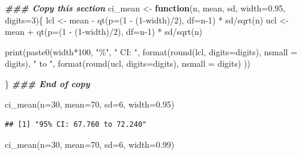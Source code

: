 \documentclass[
]{memoir}
\newenvironment{Shaded}{\begin{snugshade}}{\end{snugshade}}
\newcommand{\AttributeTok}[1]{\textcolor[rgb]{0.77,0.63,0.00}{#1}}
\newcommand{\ControlFlowTok}[1]{\textcolor[rgb]{0.13,0.29,0.53}{\textbf{#1}}}
\newcommand{\DecValTok}[1]{\textcolor[rgb]{0.00,0.00,0.81}{#1}}
\newcommand{\DocumentationTok}[1]{\textcolor[rgb]{0.56,0.35,0.01}{\textbf{\textit{#1}}}}
\newcommand{\FloatTok}[1]{\textcolor[rgb]{0.00,0.00,0.81}{#1}}
\newcommand{\FunctionTok}[1]{\textcolor[rgb]{0.00,0.00,0.00}{#1}}
\newcommand{\NormalTok}[1]{#1}
\newcommand{\OtherTok}[1]{\textcolor[rgb]{0.56,0.35,0.01}{#1}}
\newcommand{\SpecialCharTok}[1]{\textcolor[rgb]{0.00,0.00,0.00}{#1}}
\newcommand{\StringTok}[1]{\textcolor[rgb]{0.31,0.60,0.02}{#1}}
\begin{document}
\begin{Shaded}
\begin{Highlighting}[]
\DocumentationTok{\#\#\# Copy this section}
\NormalTok{ci\_mean }\OtherTok{\textless{}{-}} \ControlFlowTok{function}\NormalTok{(n, mean, sd, }\AttributeTok{width=}\FloatTok{0.95}\NormalTok{, }\AttributeTok{digits=}\DecValTok{3}\NormalTok{)\{}
\NormalTok{  lcl }\OtherTok{\textless{}{-}}\NormalTok{ mean }\SpecialCharTok{{-}} \FunctionTok{qt}\NormalTok{(}\AttributeTok{p=}\NormalTok{(}\DecValTok{1} \SpecialCharTok{{-}}\NormalTok{ (}\DecValTok{1}\SpecialCharTok{{-}}\NormalTok{width)}\SpecialCharTok{/}\DecValTok{2}\NormalTok{), }\AttributeTok{df=}\NormalTok{n}\DecValTok{{-}1}\NormalTok{) }\SpecialCharTok{*}\NormalTok{ sd}\SpecialCharTok{/}\FunctionTok{sqrt}\NormalTok{(n)}
\NormalTok{  ucl }\OtherTok{\textless{}{-}}\NormalTok{ mean }\SpecialCharTok{+} \FunctionTok{qt}\NormalTok{(}\AttributeTok{p=}\NormalTok{(}\DecValTok{1} \SpecialCharTok{{-}}\NormalTok{ (}\DecValTok{1}\SpecialCharTok{{-}}\NormalTok{width)}\SpecialCharTok{/}\DecValTok{2}\NormalTok{), }\AttributeTok{df=}\NormalTok{n}\DecValTok{{-}1}\NormalTok{) }\SpecialCharTok{*}\NormalTok{ sd}\SpecialCharTok{/}\FunctionTok{sqrt}\NormalTok{(n)}
  
  \FunctionTok{print}\NormalTok{(}\FunctionTok{paste0}\NormalTok{(width}\SpecialCharTok{*}\DecValTok{100}\NormalTok{, }\StringTok{"\%"}\NormalTok{, }\StringTok{" CI: "}\NormalTok{, }\FunctionTok{format}\NormalTok{(}\FunctionTok{round}\NormalTok{(lcl, }\AttributeTok{digits=}\NormalTok{digits), }\AttributeTok{nsmall =}\NormalTok{ digits),}
               \StringTok{" to "}\NormalTok{, }\FunctionTok{format}\NormalTok{(}\FunctionTok{round}\NormalTok{(ucl, }\AttributeTok{digits=}\NormalTok{digits), }\AttributeTok{nsmall =}\NormalTok{ digits) ))}

\NormalTok{\}}
\DocumentationTok{\#\#\# End of copy}

\FunctionTok{ci\_mean}\NormalTok{(}\AttributeTok{n=}\DecValTok{30}\NormalTok{, }\AttributeTok{mean=}\DecValTok{70}\NormalTok{, }\AttributeTok{sd=}\DecValTok{6}\NormalTok{, }\AttributeTok{width=}\FloatTok{0.95}\NormalTok{)}
\end{Highlighting}
\end{Shaded}

\begin{verbatim}
## [1] "95% CI: 67.760 to 72.240"
\end{verbatim}

\begin{Shaded}
\begin{Highlighting}[]
\FunctionTok{ci\_mean}\NormalTok{(}\AttributeTok{n=}\DecValTok{30}\NormalTok{, }\AttributeTok{mean=}\DecValTok{70}\NormalTok{, }\AttributeTok{sd=}\DecValTok{6}\NormalTok{, }\AttributeTok{width=}\FloatTok{0.99}\NormalTok{)}
\end{Highlighting}
\end{Shaded}
\end{document}
